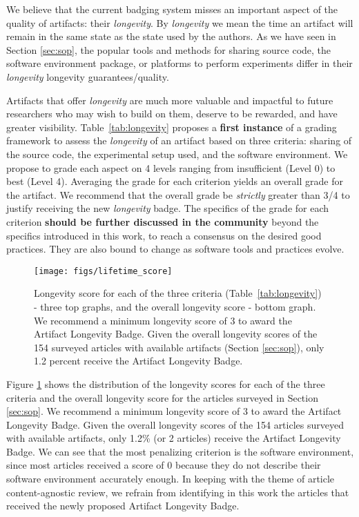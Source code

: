 \documentclass[sigconf,natbib=false]{acmart}
\begin{document}
We believe that the current badging system misses an important aspect of the quality of artifacts: their \emph{longevity}.
By \emph{longevity} we mean the time an artifact will remain in the same state as the state used by the authors.
As we have seen in Section \ref{sec:sop}, the popular tools and methods for sharing source code, the software environment package, or platforms to perform experiments differ in their \emph{longevity} longevity guarantees/quality.

Artifacts that offer \emph{longevity} are much more valuable and impactful to future researchers who may wish to build on them, deserve to be rewarded, and have greater visibility.
Table\ \ref{tab:longevity} proposes a \textbf{first instance} of a grading framework to assess the \emph{longevity} of an artifact based on three criteria: sharing of the source code, the experimental setup used, and the software environment.
We propose to grade each aspect on 4 levels ranging from insufficient (Level 0) to best (Level 4).
Averaging the grade for each criterion yields an overall grade for the artifact.
We recommend that the overall grade be \emph{strictly} greater than 3/4 to justify receiving the new \emph{longevity} badge.
The specifics of the grade for each criterion \textbf{should be further discussed in the community} beyond the specifics introduced in this work, to reach a consensus on the desired good practices.
They are also bound to change as software tools and practices evolve.

\begin{figure}
  \centering
    \texttt{[image: figs/lifetime\_score]}
  \caption{Longevity score for each of the three criteria (Table~\ref{tab:longevity}) - three top graphs, and the overall longevity score - bottom graph.
  We recommend a minimum longevity score of 3 to award the Artifact Longevity Badge.
  Given the overall longevity scores of the 154 surveyed articles with available artifacts (Section \ref{sec:sop}), only 1.2 percent receive the Artifact Longevity Badge.}\label{fig:longevity_score}
\end{figure}

Figure \ref{fig:longevity_score} shows the distribution of the longevity scores for each of the three criteria and the overall longevity score for the articles surveyed in Section \ref{sec:sop}.
We recommend a minimum longevity score of 3 to award the Artifact Longevity Badge.
Given the overall longevity scores of the 154 articles surveyed with available artifacts, only 1.2\% (or 2 articles) receive the Artifact Longevity Badge.
We can see that the most penalizing criterion is the software environment, since most articles received a score of 0 because they do not describe their software environment accurately enough. %
In keeping with the theme of article content-agnostic review, we refrain from identifying in this work the articles that received the newly proposed Artifact Longevity Badge. 
\end{document}
